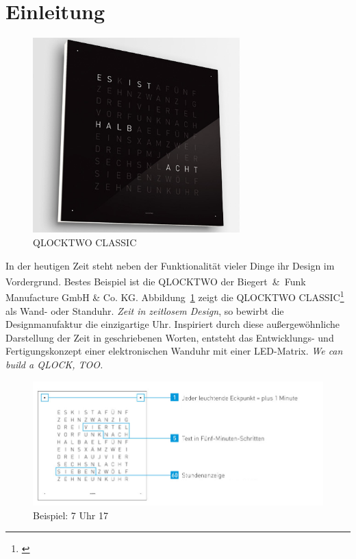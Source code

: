 
\section{Einleitung}
\label{sec:Einleitung}

\begin{figure}[t]
    \centering
    \includegraphics[width=8cm]{Abbildungen/qlocktwo-wand}
    \caption[QlockTwo]{QLOCKTWO CLASSIC}
    \label{fig:QlockTwo}
\end{figure}
%
 \begin{multicols}{2}
 In der heutigen Zeit steht neben der Funktionalität vieler Dinge ihr Design im Vordergrund. Bestes Beispiel ist die QLOCKTWO\textsuperscript{\textregistered} der Biegert~\&~Funk Manufacture GmbH \& Co. KG. Abbildung~\ref{fig:QlockTwo} zeigt die QLOCKTWO CLASSIC\footnote{\cite{Bie 13}} als Wand- oder Standuhr. %
 \emph{Zeit in zeitlosem Design}, so bewirbt die Designmanufaktur die einzigartige Uhr.
 Inspiriert durch diese außergewöhnliche Darstellung der Zeit in geschriebenen Worten, entsteht das Entwicklungs- und Fertigungskonzept einer elektronischen Wanduhr mit einer LED-Matrix. \emph{We can build a QLOCK, TOO.}
 \end{multicols}
 \begin{figure}[h]
    \centering
    \includegraphics[width=12cm]{Abbildungen/Uhrzeit_Beispiel}
    \caption[Uhrzeit_Bspl]{Beispiel: 7 Uhr 17}
    \label{fig:Uhrzeit_Bspl}
\end{figure}
